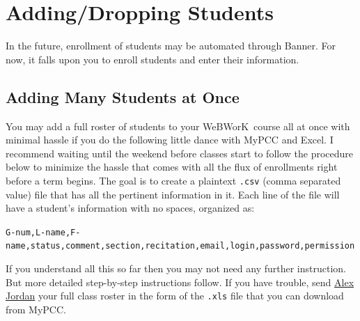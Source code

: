 \documentclass[12pt]{article}
\newcommand{\WW}{WeBWorK}
\begin{document}
\section{Adding/Dropping Students}
In the future, enrollment of students may be automated through Banner.
For now, it falls upon you to enroll students and enter their information.

\subsection{Adding Many Students at Once}
You may add a full roster of students to your \WW\ course all at once with minimal hassle if you do the following little dance with MyPCC and Excel.
I recommend waiting until the weekend before classes start to follow the procedure below to minimize the hassle that comes with all the flux of enrollments right before a term begins.
The goal is to create a plaintext \texttt{.csv} (comma separated value) file that has all the pertinent information in it.
Each line of the file will have a student's information with no spaces, organized as:\\

\small \centerline{\texttt{G-num,L-name,F-name,status,comment,section,recitation,email,login,password,permission}} \normalsize \vspace{1pc}

If you understand all this so far then you may not need any further instruction.
But more detailed step-by-step instructions follow.
If you have trouble, send \href{mailto:alex.jordan@pcc.edu}{Alex Jordan} your full class roster in the form of the \texttt{.xls} file that you can download from MyPCC.
\end{document}
